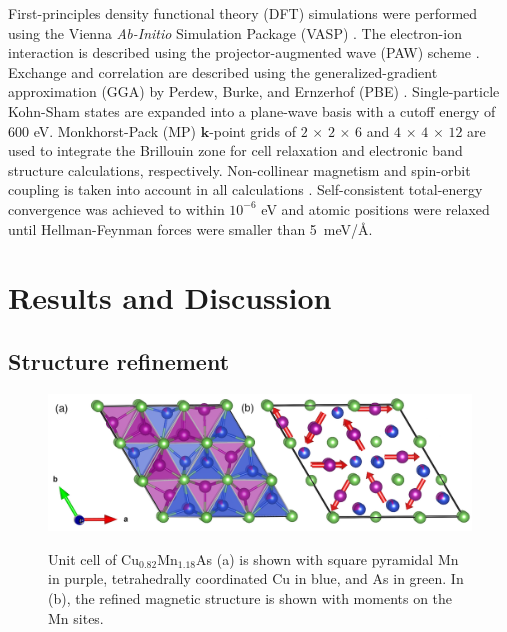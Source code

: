 \documentclass[letterpaper,10pt,doublespacing,edeposit]{uiucthesis2020}
\begin{document}
\begin{mainmatter}
First-principles density functional theory (DFT) simulations were performed using the Vienna \emph{Ab-Initio} Simulation Package  (VASP) \cite{Kresse:1996,Kresse:1999}. The electron-ion interaction is described using the projector-augmented wave (PAW) scheme \cite{Blochl:1994}. Exchange and correlation are described using the generalized-gradient approximation (GGA) by Perdew, Burke, and Ernzerhof  (PBE) \cite{Perdew:1997}. Single-particle Kohn-Sham states are expanded into a plane-wave basis with a cutoff energy of 600 eV. Monkhorst-Pack \cite{Monkhorst:1976} (MP) $\mathbf{k}$-point grids of $2\,\times\,2\,\times\,6$ and $4\,\times\,4\,\times\,12$ are used to integrate the Brillouin zone for cell relaxation and electronic band structure calculations, respectively.
Non-collinear magnetism and spin-orbit coupling is taken into account in all calculations \cite{Steiner2016}.
Self-consistent total-energy convergence was achieved to within $10^{-6}$ eV and atomic positions were relaxed until Hellman-Feynman forces were smaller than 5~meV/\AA.

\section{Results and Discussion}

\subsection{Structure refinement}

\begin{figure}
\centering\includegraphics[width=\columnwidth]{figures/ch5/h-cumnas_1x1_cells_v2.png} \\
\caption{\label{fig:unitcell}
Unit cell of Cu$_{0.82}$Mn$_{1.18}$As (a) is shown with square pyramidal Mn in purple, tetrahedrally coordinated Cu in blue, and As in green.
In (b), the refined magnetic structure is shown with moments on the Mn sites.
} 
\end{figure}


\end{mainmatter}
\end{document}
